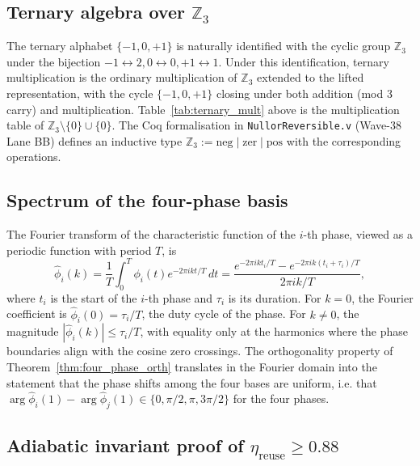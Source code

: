 \subsection{Ternary algebra over $\mathbb{Z}_3$}
\label{subsec:ternary_algebra}

The ternary alphabet $\{-1, 0, +1\}$ is naturally identified with the cyclic group
$\mathbb{Z}_3$ under the bijection $-1 \leftrightarrow 2, 0 \leftrightarrow 0,
+1 \leftrightarrow 1$.  Under this identification, ternary multiplication is the
ordinary multiplication of $\mathbb{Z}_3$ extended to the lifted representation,
with the cycle $\{-1, 0, +1\}$ closing under both addition (mod 3 carry) and
multiplication.  Table~\ref{tab:ternary_mult} above is the multiplication table of
$\mathbb{Z}_3 \setminus \{0\} \cup \{0\}$.  The Coq formalisation in
\texttt{NullorReversible.v} (Wave-38 Lane BB) defines an inductive type $\mathbb{Z}_3
:= \mathrm{neg} \mid \mathrm{zer} \mid \mathrm{pos}$ with the corresponding
operations.

\subsection{Spectrum of the four-phase basis}
\label{subsec:phase_spectrum}

The Fourier transform of the characteristic function of the $i$-th phase, viewed
as a periodic function with period $T$, is
\[
  \hat\phi_i(k) = \frac{1}{T} \int_0^T \phi_i(t) e^{-2\pi i k t / T} \, dt =
  \frac{e^{-2\pi i k t_i / T} - e^{-2\pi i k (t_i + \tau_i) / T}}{2\pi i k / T},
\]
where $t_i$ is the start of the $i$-th phase and $\tau_i$ is its duration.  For
$k = 0$, the Fourier coefficient is $\hat\phi_i(0) = \tau_i / T$, the duty cycle
of the phase.  For $k \neq 0$, the magnitude $|\hat\phi_i(k)| \leq \tau_i / T$, with
equality only at the harmonics where the phase boundaries align with the cosine
zero crossings.  The orthogonality property of
Theorem~\ref{thm:four_phase_orth} translates in the Fourier domain into the
statement that the phase shifts among the four bases are uniform, i.e. that
$\arg \hat\phi_i(1) - \arg \hat\phi_j(1) \in \{0, \pi/2, \pi, 3\pi/2\}$ for
the four phases.

\subsection{Adiabatic invariant proof of $\eta_{\text{reuse}} \geq 0.88$}
\label{subsec:adiabatic_invariant_proof}


